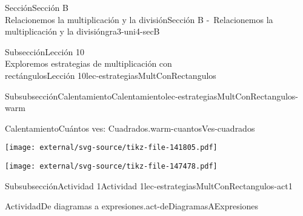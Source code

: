 \begin{sectionptx}{Sección}{{\Large Sección B\\}Relacionemos la multiplicación y la división}{}{Sección B -~Relacionemos la multiplicación y la división}{}{}{gra3-uni4-secB}
\begin{subsectionptx}{Subsección}{{\normalsize Lección 10\\[-0.05cm]}Exploremos estrategias de multiplicación con\\rectángulos}{}{Lección 10}{}{}{lec-estrategiasMultConRectangulos}
\begin{subsubsectionptx}{Subsubsección}{Calentamiento}{}{Calentamiento}{}{}{lec-estrategiasMultConRectangulos-warm}
\begin{exploration}{Calentamiento}{Cuántos ves: Cuadrados.}{warm-cuantosVes-cuadrados}
\begin{sidebyside}{3}{0}{0}{0.05}
\begin{sbspanel}{0.3}
\end{sbspanel}%
\begin{sbspanel}{0.3}%
\texttt{[image: external/svg-source/tikz-file-141805.pdf]}
\end{sbspanel}%
\begin{sbspanel}{0.3}%
\texttt{[image: external/svg-source/tikz-file-147478.pdf]}
\end{sbspanel}%
\end{sidebyside}%
\end{exploration}%
\end{subsubsectionptx}
%
%
\typeout{************************************************}
\typeout{************************************************}
%
\begin{subsubsectionptx}{Subsubsección}{Actividad 1}{}{Actividad 1}{}{}{lec-estrategiasMultConRectangulos-act1}
\begin{activity}{Actividad}{De diagramas a expresiones.}{act-deDiagramasAExpresiones}%

\end{activity}
\end{subsubsectionptx}
\end{subsectionptx}
\end{sectionptx}
